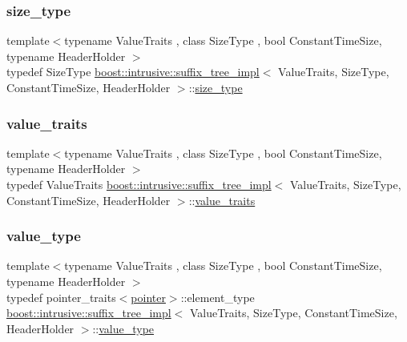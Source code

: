 \subsubsection{\texorpdfstring{size\+\_\+type}{size\_type}}
{\footnotesize\ttfamily template$<$typename Value\+Traits , class Size\+Type , bool Constant\+Time\+Size, typename Header\+Holder $>$ \\
typedef Size\+Type \hyperlink{classboost_1_1intrusive_1_1suffix__tree__impl}{boost\+::intrusive\+::suffix\+\_\+tree\+\_\+impl}$<$ Value\+Traits, Size\+Type, Constant\+Time\+Size, Header\+Holder $>$\+::\hyperlink{classboost_1_1intrusive_1_1suffix__tree__impl_ad98ea23cb22b9adc18366b5d8ab56d9b}{size\+\_\+type}}

\mbox{\label{classboost_1_1intrusive_1_1suffix__tree__impl_a30d9e164c38c11cd38917ad14e9f3e88}} 
\subsubsection{\texorpdfstring{value\+\_\+traits}{value\_traits}}
{\footnotesize\ttfamily template$<$typename Value\+Traits , class Size\+Type , bool Constant\+Time\+Size, typename Header\+Holder $>$ \\
typedef Value\+Traits \hyperlink{classboost_1_1intrusive_1_1suffix__tree__impl}{boost\+::intrusive\+::suffix\+\_\+tree\+\_\+impl}$<$ Value\+Traits, Size\+Type, Constant\+Time\+Size, Header\+Holder $>$\+::\hyperlink{classboost_1_1intrusive_1_1suffix__tree__impl_a30d9e164c38c11cd38917ad14e9f3e88}{value\+\_\+traits}}

\mbox{\label{classboost_1_1intrusive_1_1suffix__tree__impl_a592893260249dc653dfe9f36ea5d14b6}} 
\subsubsection{\texorpdfstring{value\+\_\+type}{value\_type}}
{\footnotesize\ttfamily template$<$typename Value\+Traits , class Size\+Type , bool Constant\+Time\+Size, typename Header\+Holder $>$ \\
typedef pointer\+\_\+traits$<$\hyperlink{classboost_1_1intrusive_1_1suffix__tree__impl_af8ad26e95f6cc7ba4a814d02eb8f4320}{pointer}$>$\+::element\+\_\+type \hyperlink{classboost_1_1intrusive_1_1suffix__tree__impl}{boost\+::intrusive\+::suffix\+\_\+tree\+\_\+impl}$<$ Value\+Traits, Size\+Type, Constant\+Time\+Size, Header\+Holder $>$\+::\hyperlink{classboost_1_1intrusive_1_1suffix__tree__impl_a592893260249dc653dfe9f36ea5d14b6}{value\+\_\+type}}



